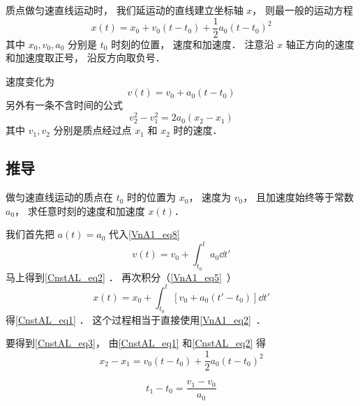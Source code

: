 
\begin{issues}
\issueTODO
\end{issues}


质点做匀速直线运动时， 我们延运动的直线建立坐标轴 $x$， 则最一般的运动方程
\begin{equation}\label{CnstAL_eq1}
x(t) = x_0 + v_0 (t - t_0) +  \frac12 a_0 (t - t_0)^2
\end{equation}
其中 $x_0, v_0, a_0$ 分别是 $t_0$ 时刻的位置， 速度和加速度． 注意沿 $x$ 轴正方向的速度和加速度取正号， 沿反方向取负号．

速度变化为
\begin{equation}\label{CnstAL_eq2}
v(t) = v_0 + a_0 (t - t_0)
\end{equation}
另外有一条不含时间的公式
\begin{equation}\label{CnstAL_eq3}
v_2^2 - v_1^2 = 2a_0 (x_2 - x_1)
\end{equation}
其中 $v_1, v_2$ 分别是质点经过点 $x_1$ 和 $x_2$ 时的速度．


\subsection{推导}
做匀速直线运动的质点在 $t_0$ 时的位置为 $x_0$， 速度为 $v_0$， 且加速度始终等于常数 $a_0$， 求任意时刻的速度和加速度 $x(t)$．

我们首先把 $a(t) = a_0$ 代入\autoref{VnA1_eq8}~
\begin{equation}
v(t) = v_0 + \int_{t_0}^t a_0 \dd{t'}
\end{equation}
马上得到\autoref{CnstAL_eq2} ． 再次积分（\autoref{VnA1_eq5}~）
\begin{equation}
x(t) = x_0 + \int_{t_0}^t [v_0 + a_0 (t' - t_0)] \dd{t'}
\end{equation}
得\autoref{CnstAL_eq1} ． 这个过程相当于直接使用\autoref{VnA1_eq2}~．

要得到\autoref{CnstAL_eq3}， 由\autoref{CnstAL_eq1} 和\autoref{CnstAL_eq2} 得
\begin{equation}
x_2 - x_1 = v_0 (t - t_0) +  \frac12 a_0 (t - t_0)^2
\end{equation}

\begin{equation}
t_1 - t_0 = \frac{v_1 - v_0}{a_0}
\end{equation}
